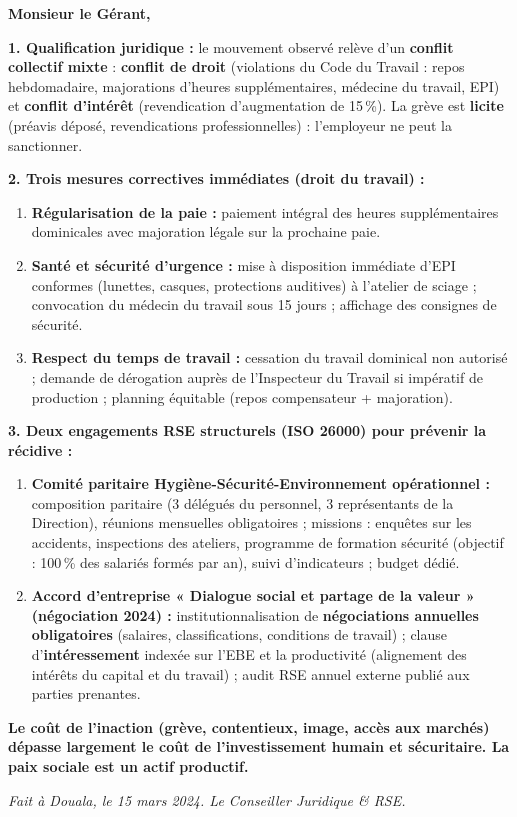 \documentclass[11pt]{article}
\begin{document}
\begin{corrige}
\textbf{Monsieur le Gérant,}

\textbf{1. Qualification juridique :} le mouvement observé relève d'un \textbf{conflit collectif mixte} : \textbf{conflit de droit} (violations du Code du Travail : repos hebdomadaire, majorations d'heures supplémentaires, médecine du travail, EPI) et \textbf{conflit d'intérêt} (revendication d'augmentation de 15\,\%). La grève est \textbf{licite} (préavis déposé, revendications professionnelles) : l'employeur ne peut la sanctionner.

\textbf{2. Trois mesures correctives immédiates (droit du travail) :}
\begin{enumerate}
    \item \textbf{Régularisation de la paie :} paiement intégral des heures supplémentaires dominicales avec majoration légale sur la prochaine paie.
    \item \textbf{Santé et sécurité d'urgence :} mise à disposition immédiate d'EPI conformes (lunettes, casques, protections auditives) à l'atelier de sciage ; convocation du médecin du travail sous 15 jours ; affichage des consignes de sécurité.
    \item \textbf{Respect du temps de travail :} cessation du travail dominical non autorisé ; demande de dérogation auprès de l'Inspecteur du Travail si impératif de production ; planning équitable (repos compensateur + majoration).
\end{enumerate}

\textbf{3. Deux engagements RSE structurels (ISO 26000) pour prévenir la récidive :}
\begin{enumerate}
    \item \textbf{Comité paritaire Hygiène-Sécurité-Environnement opérationnel :} composition paritaire (3 délégués du personnel, 3 représentants de la Direction), réunions mensuelles obligatoires ; missions : enquêtes sur les accidents, inspections des ateliers, programme de formation sécurité (objectif : 100\,\% des salariés formés par an), suivi d'indicateurs ; budget dédié.
    \item \textbf{Accord d'entreprise « Dialogue social et partage de la valeur » (négociation 2024) :} institutionnalisation de \textbf{négociations annuelles obligatoires} (salaires, classifications, conditions de travail) ; clause d'\textbf{intéressement} indexée sur l'EBE et la productivité (alignement des intérêts du capital et du travail) ; audit RSE annuel externe publié aux parties prenantes.
\end{enumerate}

\textbf{Le coût de l'inaction (grève, contentieux, image, accès aux marchés) dépasse largement le coût de l'investissement humain et sécuritaire. La paix sociale est un actif productif.}

\textit{Fait à Douala, le 15 mars 2024. Le Conseiller Juridique \& RSE.}
\end{corrige}
\end{document}
